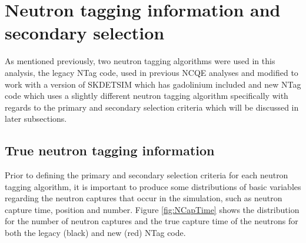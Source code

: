 \section{Neutron tagging information and secondary selection}

As mentioned previously, two neutron tagging algorithms were used in this analysis, the legacy NTag code, used in previous NCQE analyses and modified to work with a version of SKDETSIM which has gadolinium included and new NTag code which uses a slightly different neutron tagging algorithm specifically with regards to the primary and secondary selection criteria which will be discussed in later subsections.



\subsection{True neutron tagging information}

Prior to defining the primary and secondary selection criteria for each neutron tagging algorithm, it is important to produce some distributions of basic variables regarding the neutron captures that occur in the simulation, such as neutron capture time, position and number. Figure \ref{fig:NCapTime} shows the distribution for the number of neutron captures and the true capture time of the neutrons for both the legacy (black) and new (red) NTag code.  

